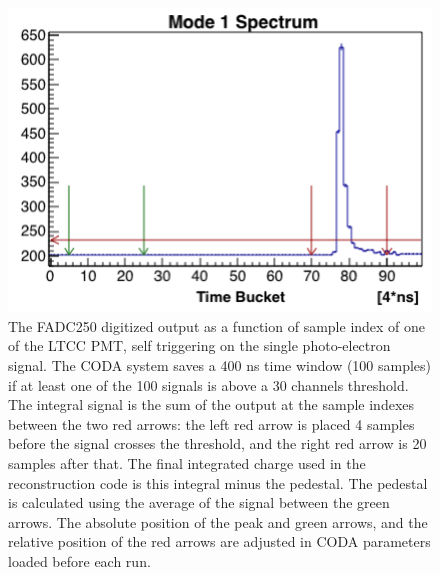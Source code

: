 \begin{figure}
	\centering
	\includegraphics[width=0.95\columnwidth,keepaspectratio]{img/fadc.png}
	\caption{The FADC250 digitized output as a function of sample index of one of the LTCC PMT, self triggering on the single photo-electron signal.
            The CODA system saves a 400 ns time window (100 samples) if at least one of the 100 signals is above a 30 channels threshold.
				The integral signal is the sum of the output at the sample indexes between the two red arrows:
            the left red arrow is placed 4 samples before the signal crosses the threshold,
            and the right red arrow is 20 samples after that. The final integrated charge used in the reconstruction code is this integral minus the pedestal.
            The pedestal is calculated using the average of the signal between the green arrows.
				The absolute position of the peak and green arrows, and the relative position of the red arrows are adjusted in CODA parameters loaded before each run.}
	\label{fig:fadc}
\end{figure}




